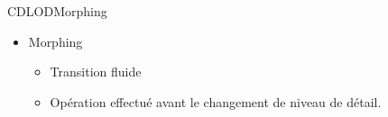 \documentclass[french]{beamer}
\begin{document}
\begin{frame}{CDLOD}{Morphing}
    
\begin{itemize}
    \item Morphing
    \begin{itemize}
        \item Transition fluide
        \item Opération effectué avant le changement de niveau de détail.
    \end{itemize}
\end{itemize}

\begin{figure}[H]
\centerline{
   }
\end{figure}
\begin{figure}[H]

\end{figure}
\end{frame}
\end{document}

